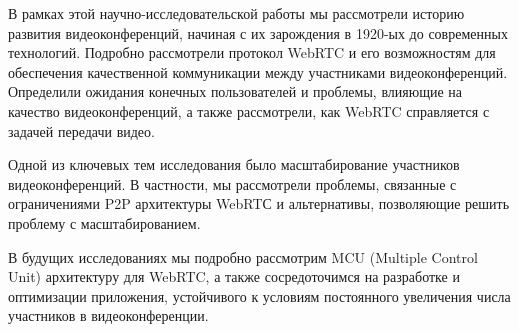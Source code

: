 
В рамках этой научно-исследовательской работы мы рассмотрели историю развития видеоконференций, начиная с их зарождения в 1920-ых до современных технологий. Подробно рассмотрели протокол WebRTC и его возможностям для обеспечения качественной коммуникации между участниками видеоконференций. Определили ожидания конечных пользователей и проблемы, влияющие на качество видеоконференций, а также рассмотрели, как WebRTC справляется с задачей передачи видео.

Одной из ключевых тем исследования было масштабирование участников видеоконференций. В частности, мы рассмотрели проблемы, связанные с ограничениями P2P архитектуры WebRTС и альтернативы, позволяющие решить проблему с масштабированием.

В будущих исследованиях мы подробно рассмотрим MCU (Multiple Control Unit) архитектуру для WebRTC, а также сосредоточимся на разработке и оптимизации приложения, устойчивого к условиям постоянного увеличения числа участников в видеоконференции.

\pagebreak